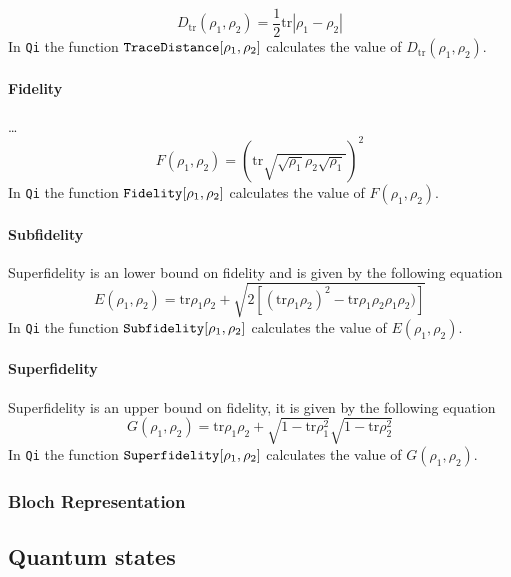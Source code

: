 \documentclass[11pt,a4paper]{article}
\newcommand{\qi}{\texttt{Qi}}
\newcommand{\tr}{\mathrm{tr}}
\newcommand{\1}{{\bf 1}}
\newcommand{\fname}[1]{\text{\texttt{#1}}}
\begin{document}
\begin{equation}
D_{\tr}(\rho_1,\rho_2)=\frac12\tr|\rho_1-\rho_2|
\end{equation}
In \qi{} the function $\fname{TraceDistance}[\rho_1,\rho_2]$ calculates the 
value of $D_{\tr}(\rho_1,\rho_2)$.

\paragraph{Fidelity}  \ldots
\begin{equation}
F(\rho_1,\rho_2)=
\left(\tr\sqrt{\sqrt{\rho_1}\rho_2\sqrt{\rho_1}}\right)^2
\end{equation}
In \qi{} the function $\fname{Fidelity}[\rho_1,\rho_2]$ calculates the 
value of $F(\rho_1,\rho_2)$.

\paragraph{Subfidelity}
Superfidelity is an lower bound on fidelity 
\cite{miszczak2008sup}
and is given by the following equation
\begin{equation}
E(\rho_1,\rho_2)=
\tr\rho_1\rho_2+\sqrt{2[(\tr\rho_1\rho_2)^2-\tr\rho_1\rho_2\rho_1\rho_2)]}
\end{equation}
In \qi{} the function $\fname{Subfidelity}[\rho_1,\rho_2]$ calculates the 
value of $E(\rho_1,\rho_2)$.

\paragraph{Superfidelity} Superfidelity is an upper bound on fidelity,
it is given by the following equation
\begin{equation}
G(\rho_1,\rho_2)=\tr\rho_1\rho_2+\sqrt{1-\tr\rho_1^2}\sqrt{1-\tr\rho_2^2}
\end{equation}
In \qi{} the function $\fname{Superfidelity}[\rho_1,\rho_2]$ calculates the 
value of $G(\rho_1,\rho_2)$.

\subsubsection{Bloch Representation}

\subsection{Quantum states}
\end{document}
